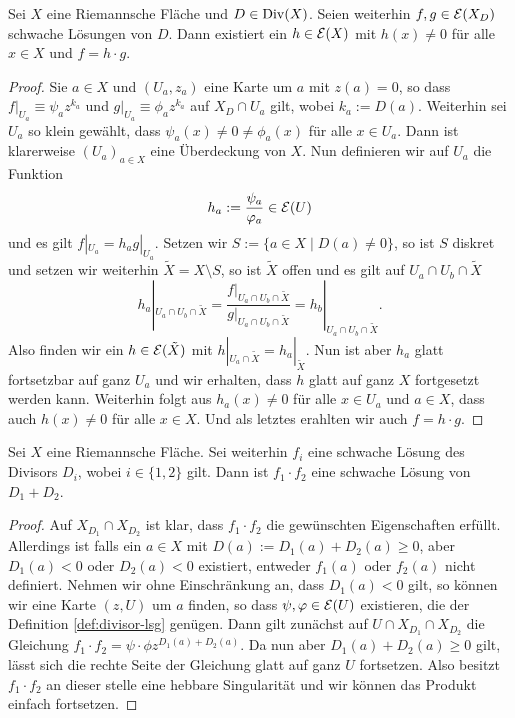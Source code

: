 \begin{lemma}
  Sei $X$ eine Riemannsche Fläche und $D \in \operatorname{Div}(X)$. Seien weiterhin
  $f,g \in \mathcal{E}(X_D)$ schwache Lösungen von $D$. Dann existiert ein
  $h \in \mathcal{E}(X)$ mit $h(x) \neq 0$ für alle $x \in X$ und $ f
  = h\cdot g$.
\end{lemma}

\begin{proof}
  Sie $a \in X$ und $(U_a, z_a)$ eine Karte um $a$ mit $z(a) = 0$, so
  dass $f|_{U_a} \equiv \psi_a z^{k_a}$ und $g|_{U_a} \equiv \phi_a
  z^{k_a}$ auf $X_D \cap U_a$ gilt, wobei $k_a := D(a)$. Weiterhin sei
  $U_a$ so klein gewählt, dass $\psi_a(x) \neq 0 \neq \phi_a(x)$ für
  alle $x \in U_a$. Dann ist klarerweise $(U_a)_{a \in X}$ eine
  Überdeckung von $X$. Nun definieren wir auf $U_a$ die Funktion
  \[
  h_a := \frac{\psi_a}{\varphi_a} \in \mathcal{E}(U)
  \]
  und es gilt $f|_{U_a} = h_a g|_{U_a}$. Setzen wir $S := \{ a \in X
  \mid D(a) \neq 0\}$, so ist $S$ diskret und setzen wir weiterhin
  $\tilde X = X \setminus S$, so ist $\tilde X$ offen und es gilt auf $U_a \cap U_b \cap
  \tilde X$
  \[
  h_a|_{U_a \cap U_b \cap \tilde X} = \frac{f|_{U_a \cap U_b \cap
      \tilde X}}{g|_{U_a \cap U_b \cap \tilde X}} = h_b|_{U_a \cap U_b
    \cap \tilde X}.
  \]
  Also finden wir ein $h \in \mathcal{E}(\tilde X)$ mit $h|_{U_a \cap \tilde
    X} = h_a|_{\tilde X}$. Nun ist aber $h_a$ glatt fortsetzbar auf
  ganz $U_a$ und wir erhalten, dass $h$ glatt auf ganz $X$ fortgesetzt
  werden kann. Weiterhin folgt aus $h_a(x) \neq 0$ für alle $x \in
  U_a$ und $a \in X$, dass auch $h(x) \neq 0$ für alle $x \in X$. Und
  als letztes erahlten wir auch $f = h \cdot g$.
\end{proof}

\begin{lemma}
  \label{lemma:lsg-produkt}
  Sei $X$ eine Riemannsche Fläche. Sei weiterhin $f_i$ 
  eine schwache Lösung des Divisors $D_i$, wobei $i \in \{1,2\}$ gilt. Dann ist
  $f_1 \cdot f_2$ eine schwache Lösung von $D_1 + D_2$.
\end{lemma}

\begin{proof}
  Auf $X_{D_1} \cap X_{D_2}$ ist klar, dass $f_1 \cdot f_2$ die
  gewünschten Eigenschaften erfüllt. Allerdings ist falls ein $a \in
  X$ mit $D(a) := D_1(a) +
  D_2(a) \geq 0$, aber $D_1(a) < 0$ oder $D_2(a) < 0$ existiert, entweder $f_1(a)$ oder
  $f_2(a)$ nicht definiert. Nehmen wir ohne Einschränkung an, dass
  $D_1(a) < 0$ gilt, so können wir eine Karte $(z,U)$ um $a$ finden,
  so dass $\psi, \varphi \in \mathcal{E}(U)$ existieren, die der Definition
  \ref{def:divisor-lsg} genügen. Dann gilt zunächst auf $U \cap
  X_{D_1} \cap X_{D_2}$ die Gleichung $f_1 \cdot f_2 = \psi \cdot \phi
  z^{D_1(a) + D_2(a)}$. Da nun aber $D_1(a) + D_2(a) \geq 0$ gilt,
  lässt sich die rechte Seite der Gleichung glatt auf ganz $U$
  fortsetzen. Also besitzt $f_1 \cdot f_2$ an dieser stelle eine
  hebbare Singularität und wir können das Produkt einfach fortsetzen.
\end{proof}

